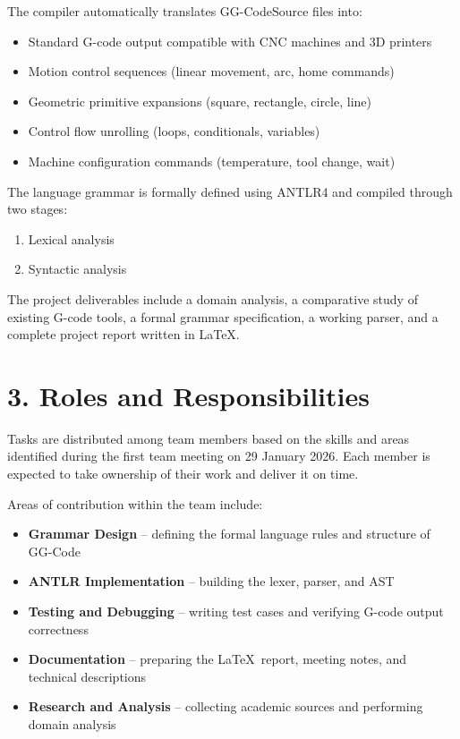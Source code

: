 The compiler automatically translates GG-CodeSource files into:

\begin{itemize}[leftmargin=2em, label={--}]
    \item Standard G-code output compatible with CNC machines and 3D printers
    \item Motion control sequences (linear movement, arc, home commands)
    \item Geometric primitive expansions (square, rectangle, circle, line)
    \item Control flow unrolling (loops, conditionals, variables)
    \item Machine configuration commands (temperature, tool change, wait)
\end{itemize}

The language grammar is formally defined using ANTLR4 and compiled through two stages:

\begin{enumerate}[leftmargin=2em]
    \item Lexical analysis
    \item Syntactic analysis
\end{enumerate}

The project deliverables include a domain analysis, a comparative study of existing G-code tools,
a formal grammar specification, a working parser, and a complete project report written in \LaTeX.

\section*{3. Roles and Responsibilities}

Tasks are distributed among team members based on the skills and areas identified during the
first team meeting on 29 January 2026. Each member is expected to take ownership of their work
and deliver it on time.

Areas of contribution within the team include:

\begin{itemize}[leftmargin=2em, label={--}]
    \item \textbf{Grammar Design} -- defining the formal language rules and structure of GG-Code
    \item \textbf{ANTLR Implementation} -- building the lexer, parser, and AST
    \item \textbf{Testing and Debugging} -- writing test cases and verifying G-code output correctness
    \item \textbf{Documentation} -- preparing the \LaTeX\ report, meeting notes, and technical descriptions
    \item \textbf{Research and Analysis} -- collecting academic sources and performing domain analysis
\end{itemize}

